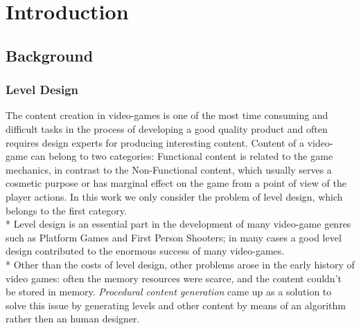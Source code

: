 \chapter{Introduction}

\section{Background}
\subsection{Level Design}
The content creation in video-games is one of the most time consuming and difficult tasks in the process of developing a good quality product and often requires design experts for producing interesting content. Content of a video-game can belong to two categories: Functional content is related to the game mechanics, in contrast to the Non-Functional content, which usually serves a cosmetic purpose or has marginal effect on the game from a point of view of the player actions. In this work we only consider the problem of level design, which belongs to the first category. \\*
Level design is an essential part in the development of many video-game genres such as Platform Games and First Person Shooters; in many cases a good level design contributed to the enormous success of many video-games. \\*
Other than the costs of level design, other problems arose in the early history of video games: often the memory resources were scarce, and the content couldn't be stored in memory. \textit{Procedural content generation} came up as a solution to solve this issue by generating levels and other content by means of an algorithm rather then an human designer.


